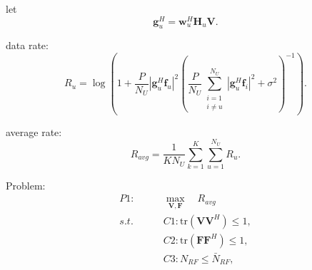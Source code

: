 \documentclass[conference]{IEEEtran}
\begin{document}
let
\begin{equation}
{\bm{g}}_{u}^H = \bm{w}^H_{u} \bm{H}_{u} \bm{V}.
\end{equation}

data rate:
\begin{equation}
R_{u} = \log\left(1+\frac{P}{N_U}|{\bm{g}}_{u}^H \bm{f}_{u}|^2\left(\frac{P}{N_U}\displaystyle\sum_{\substack{i=1 \\ i\neq u}}^{N_U}|{\bm{g}}_{u}^H\bm{f}_{i}|^2+\sigma^2\right)^{-1}\right).
\end{equation}

average rate:
\begin{equation}
R_{avg}=\frac{1}{KN_U}\sum_{k=1}^{K}\sum_{u=1}^{N_U}R_{u}.
\end{equation}


Problem:
\begin{equation}
\begin{aligned}
P1:\qquad&\max_{\bm V,\bm F} \quad R_{avg}\\
s.t. \quad& C1:\mathrm{tr}\left(\bm V\bm V^H\right)\leq 1,\\
\quad& C2:\mathrm{tr}\left(\bm F\bm F^H\right)\leq 1,\\
\quad& C3:N_{RF}\leq \bar{N}_{RF},
\end{aligned}
\end{equation}
\end{document}
